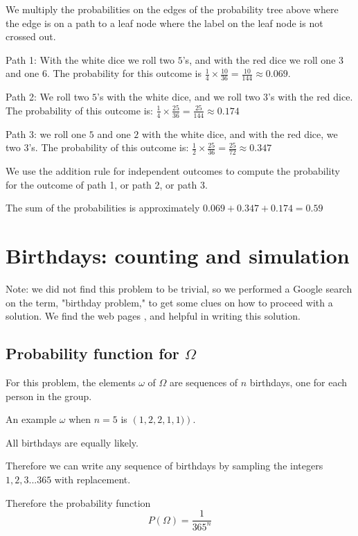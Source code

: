 \documentclass[a4paper,11pt]{article}
\begin{document}
We multiply the probabilities on the edges of the probability tree above
where the edge is on a path to a leaf node where the label on
the leaf node is not crossed out.

Path 1: With the white dice we roll two $5$'s, and with the red dice
we roll one $3$ and one $6$.  The probability for this outcome is
$\frac{1}{4} \times \frac{10}{36} = \frac{10}{144} \approx 0.069$.

Path 2: We roll two $5$'s with the white dice, and we roll two $3$'s
with the red dice.  The probability of this outcome is:
$\frac{1}{4} \times \frac{25}{36} = \frac{25}{144} \approx 0.174$

Path 3: we roll one $5$ and one $2$ with the white dice,
and with the red dice, we two $3$'s.  The probability of this outcome 
is: $\frac{1}{2} \times \frac{25}{36} = \frac{25}{72} \approx 0.347$

We use the addition rule for independent outcomes to compute the
probability for the outcome of path 1, or path 2, or path 3.

The sum of the probabilities is approximately 
$0.069 + 0.347 + 0.174 = 0.59$

\section{Birthdays: counting and simulation}
Note: we did not find this problem to be trivial, so we performed a
Google search on the term, "birthday problem," to get some clues
on how to proceed with a solution.  We find the web pages
\cite{birthProbWiki}, and \cite{betterExpBirth} helpful in writing
this solution.


\subsection{Probability function for $\Omega$}\label{probOmega}
For this problem, the elements $\omega$ of $\Omega$ are sequences of $n$
birthdays, one for each person in the group.  

An example $\omega$ when $n=5$ is $\left( 1, 2, 2, 1, 1) \right)$.

All birthdays are equally likely.

Therefore we can write any sequence of birthdays by sampling the
integers ${1,2,3...365}$ with replacement.


Therefore the probability function
\begin{equation}
P\left ( \Omega \right) = \frac{1}{365^{n}}
\end{equation} 
\end{document}
